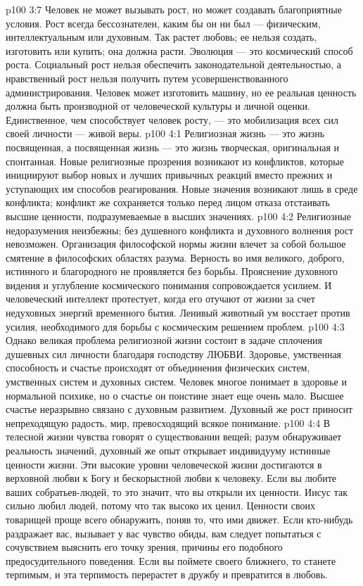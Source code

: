 \vs p100 3:7 Человек не может вызывать рост, но может создавать благоприятные условия. Рост всегда бессознателен, каким бы он ни был --- физическим, интеллектуальным или духовным. Так растет любовь; ее нельзя создать, изготовить или купить; она должна расти. Эволюция --- это космический способ роста. Социальный рост нельзя обеспечить законодательной деятельностью, а нравственный рост нельзя получить путем усовершенствованного администрирования. Человек может изготовить машину, но ее реальная ценность должна быть производной от человеческой культуры и личной оценки. Единственное, чем способствует человек росту, --- это мобилизация всех сил своей личности --- живой веры.
\vs p100 4:1 Религиозная жизнь --- это жизнь посвященная, а посвященная жизнь --- это жизнь творческая, оригинальная и спонтанная. Новые религиозные прозрения возникают из конфликтов, которые инициируют выбор новых и лучших привычных реакций вместо прежних и уступающих им способов реагирования. Новые значения возникают лишь в среде конфликта; конфликт же сохраняется только перед лицом отказа отстаивать высшие ценности, подразумеваемые в высших значениях.
\vs p100 4:2 Религиозные недоразумения неизбежны; без душевного конфликта и духовного волнения рост невозможен. Организация философской нормы жизни влечет за собой большое смятение в философских областях разума. Верность во имя великого, доброго, истинного и благородного не проявляется без борьбы. Прояснение духовного видения и углубление космического понимания сопровождается усилием. И человеческий интеллект протестует, когда его отучают от жизни за счет недуховных энергий временного бытия. Ленивый животный ум восстает против усилия, необходимого для борьбы с космическим решением проблем.
\vs p100 4:3 Однако великая проблема религиозной жизни состоит в задаче сплочения душевных сил личности благодаря господству ЛЮБВИ. Здоровье, умственная способность и счастье происходят от объединения физических систем, умственных систем и духовных систем. Человек многое понимает в здоровье и нормальной психике, но о счастье он поистине знает еще очень мало. Высшее счастье неразрывно связано с духовным развитием. Духовный же рост приносит непреходящую радость, мир, превосходящий всякое понимание.
\vs p100 4:4 \pc В телесной жизни чувства говорят о существовании вещей; разум обнаруживает реальность значений, духовный же опыт открывает индивидууму истинные ценности жизни. Эти высокие уровни человеческой жизни достигаются в верховной любви к Богу и бескорыстной любви к человеку. Если вы любите ваших собратьев\hyp{}людей, то это значит, что вы открыли их ценности. Иисус так сильно любил людей, потому что так высоко их ценил. Ценности своих товарищей проще всего обнаружить, поняв то, что ими движет. Если кто\hyp{}нибудь раздражает вас, вызывает у вас чувство обиды, вам следует попытаться с сочувствием выяснить его точку зрения, причины его подобного предосудительного поведения. Если вы поймете своего ближнего, то станете терпимым, и эта терпимость перерастет в дружбу и превратится в любовь.

